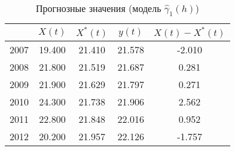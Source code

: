 \begin{table}[ht]
\centering
\caption{Прогнозные значения (модель $ \widehat{\gamma}_1(h) $)} 
\label{table:lin-prediction}
\begin{tabular}{r|cccc}
  \hline
 & $X(t)$ & $X^{*}(t)$ & $y(t)$ & $ X(t) - X^{*}(t) $ \\ 
  \hline
2007 & 19.400 & 21.410 & 21.578 & -2.010 \\ 
  2008 & 21.800 & 21.519 & 21.687 & 0.281 \\ 
  2009 & 21.900 & 21.629 & 21.797 & 0.271 \\ 
  2010 & 24.300 & 21.738 & 21.906 & 2.562 \\ 
  2011 & 22.800 & 21.848 & 22.016 & 0.952 \\ 
  2012 & 20.200 & 21.957 & 22.126 & -1.757 \\ 
   \hline
\end{tabular}
\end{table}
